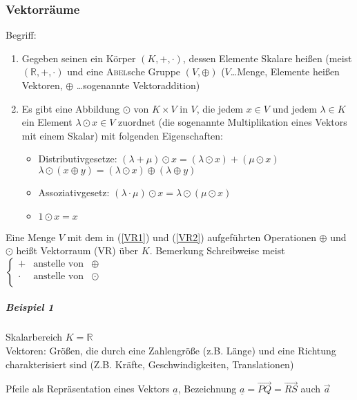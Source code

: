 \documentclass[a4paper]{scrartcl}
\begin{document}
\subsubsection{Vektorräume}\label{VR}
Begriff:
\begin{enumerate}
\item \label{VR1} Gegeben seinen ein Körper $(K,+,\cdot)$, dessen Elemente Skalare heißen (meist $(\mathbb{R},+,\cdot)$ und eine \textsc{Abel}sche Gruppe $(V,\oplus)$ ($V$\dots Menge, Elemente heißen Vektoren, $\oplus$ \dots sogenannte Vektoraddition)
\item \label{VR2} Es gibt eine Abbildung $\odot$ von $K \times V \text{ in } V$, die jedem $x\in V$ und jedem $\lambda \in K$ ein Element $\lambda \odot x \in V$ zuordnet (die sogenannte Multiplikation eines Vektors mit einem Skalar) mit folgenden Eigenschaften:
\begin{itemize}
\item Distributivgesetze: $(\lambda + \mu ) \odot x = (\lambda \odot x) + (\mu \odot x)$\\
$\lambda \odot ( x \oplus y) = (\lambda \odot x ) \oplus (\lambda \oplus y)$
\item Assoziativgesetz: $(\lambda \cdot \mu) \odot x = \lambda \odot (\mu \odot x) $
\item $1\odot x = x$
\end{itemize}
\end{enumerate}
Eine Menge $V$ mit dem in (\ref{VR1}) und (\ref{VR2}) aufgeführten Operationen $\oplus$ und $\odot$ heißt Vektorraum (VR) über $K$.
Bemerkung Schreibweise meist  $\left\{ \begin{array}{rcl}
         +
         & \mbox{anstelle von}
         & \oplus \\ 
        \cdot
         & \mbox{anstelle von} 
         & \odot \\
                \end{array}\right.$

\subparagraph{Beispiel 1} Skalarbereich $K = \mathbb{R}$\\
Vektoren: Größen, die durch eine Zahlengröße (z.B. Länge) und eine Richtung charakterisiert sind (Z.B. Kräfte, Geschwindigkeiten, Translationen)

 Pfeile als Repräsentation eines Vektors $\underline{a}$, Bezeichnung $\underline{a} = \overrightarrow{PQ} = \overrightarrow{RS}$ auch $\vec{a}$
\end{document}
